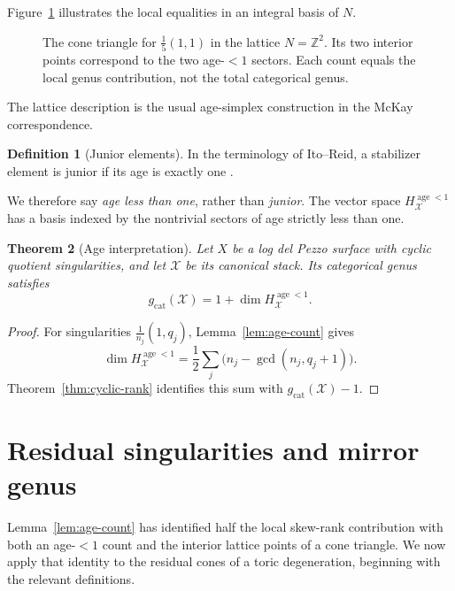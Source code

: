 \documentclass[11pt]{article}
\theoremstyle{plain}
\newtheorem{theorem}{Theorem}[section]
\theoremstyle{definition}
\newtheorem{definition}[theorem]{Definition}
\theoremstyle{remark}
\newcommand{\cX}{\mathcal X}
\newcommand{\Z}{\mathbb Z}
\newcommand{\1}{\mathbf 1}
\begin{document}
Figure~\ref{fig:local-triangle} illustrates the local equalities in an integral basis of $N$.
\begin{figure}[htbp]
\centering

\caption{The cone triangle for $\frac15(1,1)$ in the lattice $N=\Z^2$.  Its two interior points correspond to the two age-$<1$ sectors.  Each count equals the local genus contribution, not the total categorical genus.}
\label{fig:local-triangle}
\end{figure}

The lattice description is the usual age-simplex construction in the McKay correspondence.

\begin{definition}[Junior elements]
In the terminology of Ito--Reid, a stabilizer element is junior if its age is exactly one \cite[Section 1.2]{ItoReid}.
\end{definition}

We therefore say \emph{age less than one}, rather than \emph{junior}.  The vector space $H^{\operatorname{age}<1}_{\cX}$ has a basis indexed by the nontrivial sectors of age strictly less than one.

\begin{theorem}[Age interpretation]\label{thm:age-interpretation}
Let $X$ be a log del Pezzo surface with cyclic quotient singularities, and let $\cX$ be its canonical stack.  Its categorical genus satisfies
\begin{equation}\label{eq:age-genus}
\boxed{
g_{\mathrm{cat}}(\cX)=1+\dim H^{\operatorname{age}<1}_{\cX}.}
\end{equation}
\end{theorem}

\begin{proof}
For singularities $\frac1{n_j}(1,q_j)$, Lemma~\ref{lem:age-count} gives
\[
\dim H^{\operatorname{age}<1}_{\cX}
=\frac12\sum_j\bigl(n_j-\gcd(n_j,q_j+1)\bigr).
\]
Theorem~\ref{thm:cyclic-rank} identifies this sum with $g_{\mathrm{cat}}(\cX)-1$.
\end{proof}


\section{Residual singularities and mirror genus}\label{sec:mirror}

Lemma~\ref{lem:age-count} has identified half the local skew-rank contribution with both an age-$<1$ count and the interior lattice points of a cone triangle.  We now apply that identity to the residual cones of a toric degeneration, beginning with the relevant definitions.
\end{document}
